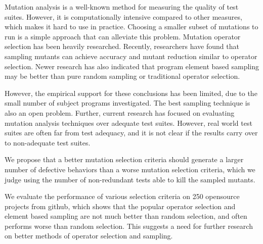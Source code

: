 Mutation analysis is a well-known method for measuring the quality of
test suites. However, it is computationally intensive compared to
other measures, which makes it hard to use in practice. Choosing a
smaller subset of mutations to run is a simple approach that can
alleviate this problem.  Mutation operator selection has been heavily
researched. Recently, researchers have found that sampling mutants can
achieve accuracy and mutant reduction similar to operator selection.
Newer research has also indicated that program element based sampling
may be better than pure random sampling or traditional operator selection.

%
However, the empirical support for these conclusions has been limited,
due to the small number of subject programs investigated. The best sampling
technique is also an open problem. Further, current research has focused
on evaluating mutation analysis techniques over adequate test suites. However,
real world test suites are often far from test adequacy, and it is not clear
if the results carry over to non-adequate test suites.

We propose that a better mutation selection criteria should generate a larger
number of defective behaviors than a worse mutation selection criteria, which
we judge using the number of non-redundant tests able to kill the sampled
mutants.

We evaluate the performance of various selection criteria on 250 opensource
projects from github, which shows that the popular operator selection and
element based sampling are not much better than random selection, and often
performs worse than random selection. This suggests a need for further research
on better methods of operator selection and sampling.






